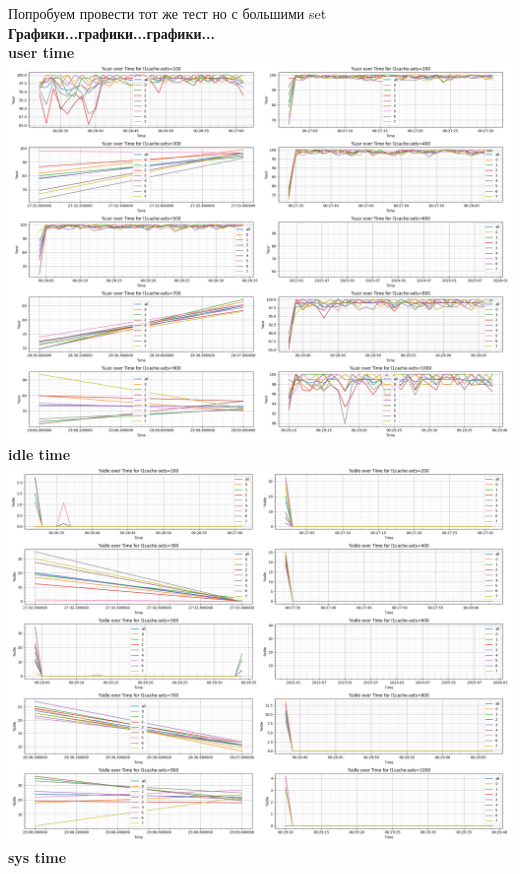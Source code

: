 Попробуем провести тот же тест но с большими set
\textbf{Графики...графики...графики...}\\
\textbf{user time}\\
\includegraphics[width=\textwidth]{./cache/image/l1cache-sets-usr-cpu-2.png}
\textbf{idle time}\\
\includegraphics[width=\textwidth]{./cache/image/l1cache-sets-idle-cpu-2.png}
\textbf{sys time}\\

